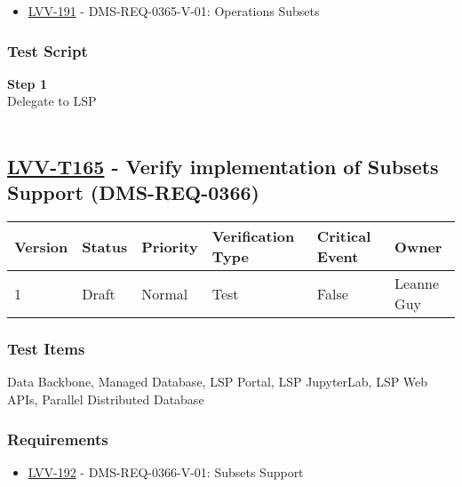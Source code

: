 \begin{itemize}
\tightlist
\item
  \href{https://jira.lsstcorp.org/browse/LVV-191}{LVV-191} -
  DMS-REQ-0365-V-01: Operations Subsets
\end{itemize}

\hypertarget{test-script-141}{%
\subsubsection{Test Script}\label{test-script-141}}

\textbf{Step 1}\\
Delegate to LSP\\
~\\

\hypertarget{lvv-t165---verify-implementation-of-subsets-support-dms-req-0366}{%
\subsection{\texorpdfstring{\href{https://jira.lsstcorp.org/secure/Tests.jspa\#/testCase/LVV-T165}{LVV-T165}
- Verify implementation of Subsets Support
(DMS-REQ-0366)}{LVV-T165 - Verify implementation of Subsets Support (DMS-REQ-0366)}}\label{lvv-t165---verify-implementation-of-subsets-support-dms-req-0366}}

\begin{longtable}[]{@{}llllll@{}}
\toprule
Version & Status & Priority & Verification Type & Critical Event &
Owner\tabularnewline
\midrule
\endhead
1 & Draft & Normal & Test & False & Leanne Guy\tabularnewline
\bottomrule
\end{longtable}

\hypertarget{test-items-141}{%
\subsubsection{Test Items}\label{test-items-141}}

Data Backbone, Managed Database, LSP Portal, LSP JupyterLab, LSP Web
APIs, Parallel Distributed Database~

\hypertarget{requirements-142}{%
\subsubsection{Requirements}\label{requirements-142}}

\begin{itemize}
\tightlist
\item
  \href{https://jira.lsstcorp.org/browse/LVV-192}{LVV-192} -
  DMS-REQ-0366-V-01: Subsets Support
\end{itemize}


